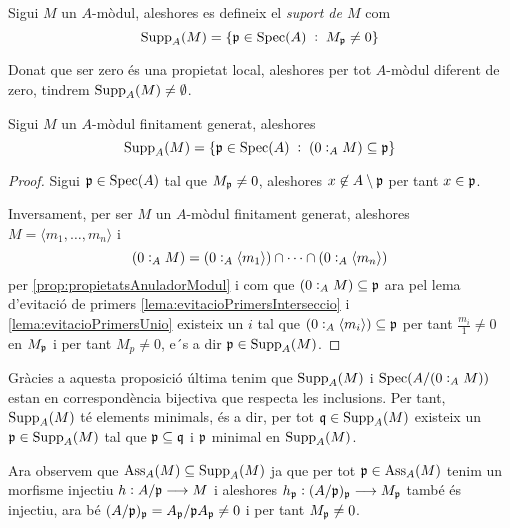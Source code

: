 \documentclass[../../../main.tex]{subfiles}
\begin{document}
\begin{defi}
[Suport]\label{def:suport} Sigui $M$ un $A$-mòdul, aleshores es defineix el \textit{suport de $M$} com
\begin{equation}
    \notag
    \operatorname{Supp}_A(M) = \{\mathfrak{p}\in\mathrm{Spec}(A)\;:\;M_{\mathfrak{p}}\not=0\}
\end{equation}
\end{defi}

Donat que ser zero és una propietat local, aleshores per tot $A$-mòdul diferent de zero, tindrem $\operatorname{Supp}_A(M)\neq \emptyset$.

\begin{prop}
\label{prop:suport} Sigui $M$ un $A$-mòdul finitament generat, aleshores
\begin{equation}
    \notag
    \operatorname{Supp}_A(M) = \{\mathfrak{p}\in\mathrm{Spec}(A)\;:\;(0:_AM)\subseteq\mathfrak{p}\}
\end{equation}
\end{prop}
\begin{proof}
Sigui $\mathfrak{p}\in\mathrm{Spec}(A)$ tal que $M_{\mathfrak{p}}\neq 0$, aleshores $x\not\in A\setminus\mathfrak{p}$ per tant $x\in\mathfrak{p}$.

Inversament, per ser $M$ un $A$-mòdul finitament generat, aleshores $M = \langle m_1,\ldots,m_n\rangle$ i
\begin{equation}
    \notag
    (0:_AM)=(0:_A\langle m_1\rangle)\cap\cdots\cap(0:_A\langle m_n\rangle)
\end{equation}
per \ref{prop:propietatsAnuladorModul} i com que $(0:_AM)\subseteq\mathfrak{p}$ ara pel lema d'evitació de primers \ref{lema:evitacioPrimersInterseccio} i \ref{lema:evitacioPrimersUnio} existeix un $i$ tal que $(0:_A\langle m_i\rangle)\subseteq\mathfrak{p}$ per tant $\frac{m_i}{1}\not=0$ en $M_{\mathfrak{p}}$ i per tant $M_p\neq 0$, e´s a dir $\mathfrak{p}\in\operatorname{Supp}_A(M)$.
\end{proof}


\begin{nota}
Gràcies a aquesta proposició última tenim que $\operatorname{Supp}_A(M)$ i $\mathrm{Spec}(A/(0:_AM))$ estan en correspondència bijectiva que respecta les inclusions. Per tant, $\operatorname{Supp}_A(M)$ té elements minimals, és a dir, per tot $\mathfrak{q}\in\operatorname{Supp}_A(M)$ existeix un $\mathfrak{p}\in\operatorname{Supp}_A(M)$ tal que $\mathfrak{p}\subseteq\mathfrak{q}$ i $\mathfrak{p}$ minimal en $\operatorname{Supp}_A(M)$.
\end{nota}

\begin{nota}
Ara observem que $\operatorname{Ass}_A(M)\subseteq \operatorname{Supp}_A(M)$ ja que per tot $\mathfrak{p}\in\operatorname{Ass}_A(M)$ tenim un morfisme injectiu $h:A/\mathfrak{p}\longrightarrow M$ i aleshores $h_{\mathfrak{p}}:(A/\mathfrak{p})_{\mathfrak{p}}\longrightarrow M_{\mathfrak{p}}$ també és injectiu, ara bé $(A/\mathfrak{p})_{\mathfrak{p}} = A_{\mathfrak{p}}/\mathfrak{p} A_{\mathfrak{p}}\neq 0$ i per tant $M_{\mathfrak{p}}\neq 0$.
\end{nota}
\end{document}
